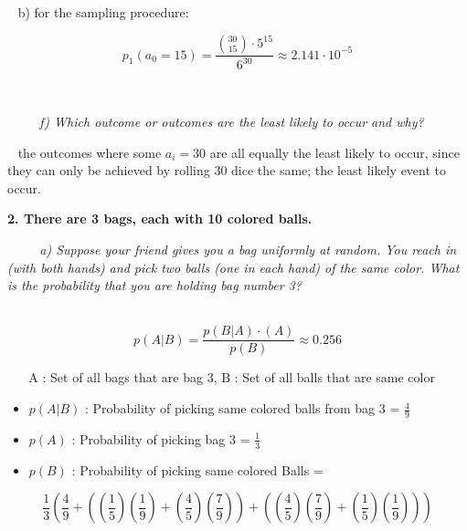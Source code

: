 \documentclass[12pt, letterpaper]{article}
\begin{document}
\-\ \newline
\textnormal{b) for the sampling procedure:}

\[ p_1(a_0 = 15) = \frac{{30 \choose 15} \cdot 5^{15}}{6^{30}} \approx 2.141\cdot10^{-5}\]

\-\ \newline
\-\ 

\-\ \newline
\-\ \newline
\-\ \it{ f) Which outcome or outcomes are the least likely to occur and why?  }

\-\ \newline
\textnormal{the outcomes where some \(a_i = 30\) are all equally the least likely to occur, since they can only be achieved by rolling 30 dice the same; the least likely event to occur.}


\newpage
\bf{ 2. There are 3 bags, each with 10 colored balls. }

\-\ \newline
\-\ \newline
\-\ \it{ a) Suppose your friend gives you a bag uniformly at random. You reach in (with both hands) and
pick two balls (one in each hand) of the same color. What is the probability that you are holding
bag number 3?  }

\-\ \newline
\[p(A | B) = \frac{p(B | A)\cdotp(A)}{p(B)} \approx 0.256\]

\-\ \newline
\-\ \newline
A : Set of all bags that are bag 3, 
B : Set of all balls that are same color

\begin{itemize}
    \item \( p(A | B) \) : Probability of picking same colored balls from bag 3 = \(\frac{4}{9}\)
    \item \( p(A) \) : Probability of picking bag 3 = \(\frac{1}{3} \)
    \item \( p(B)\) : Probability of picking same colored Balls =
\end{itemize} 

\[ \frac{1}{3}( \frac{4}{9} + (\left(\frac{1}{5}\right)\left(\frac{1}{9}\right) + \left(\frac{4}{5}\right)\left(\frac{7}{9}\right)) + (\left(\frac{4}{5}\right)\left(\frac{7}{9}\right) + \left(\frac{1}{5}\right)\left(\frac{1}{9}\right)) ) \]
\end{document}
